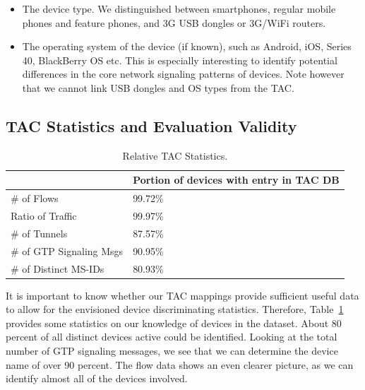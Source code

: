 \begin{itemize}
\item The device type. We distinguished between smartphones, regular mobile phones and feature phones, and 3G USB dongles or 3G/WiFi routers.

\item The operating system of the device (if known), such as Android, iOS, Series 40, BlackBerry OS etc. This is especially interesting to identify potential differences in the core network signaling patterns of devices. Note however that we cannot link USB dongles and OS types from the \ac{TAC}.

\end{itemize}







\subsection{\acs{TAC} Statistics and Evaluation Validity}

\begin{table}
\centering
\caption{Relative \acs{TAC} Statistics.}
\label{tab:tacstats-CONEXT}
\begin{tabular}{|p{4cm}|p{3cm}|} \hline
& \textbf{Portion of devices with entry in TAC DB}\\ \hline
\# of Flows & 99.72\% \\ \hline
Ratio of Traffic & 99.97\%\\ \hline
\# of Tunnels & 87.57\% \\ \hline
\# of GTP Signaling Msgs & 90.95\% \\ \hline
\# of Distinct \acp{MS-ID} & 80.93\%\\ \hline
\end{tabular}
\end{table}


It is important to know whether our \ac{TAC} mappings provide sufficient useful data to allow for the envisioned device discriminating statistics. Therefore, Table~\ref{tab:tacstats-CONEXT} provides some statistics on our knowledge of devices in the dataset. About 80 percent of all  distinct devices active could be identified. Looking at the total number of \ac{GTP} signaling messages, we see that we can determine the device name of over 90 percent.
The flow data shows an even clearer picture, as we can identify almost all of the devices involved.


